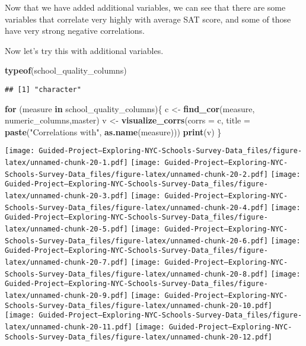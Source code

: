 \documentclass[]{article}
\newenvironment{Shaded}{\begin{snugshade}}{\end{snugshade}}
\newcommand{\ControlFlowTok}[1]{\textcolor[rgb]{0.13,0.29,0.53}{\textbf{#1}}}
\newcommand{\DataTypeTok}[1]{\textcolor[rgb]{0.13,0.29,0.53}{#1}}
\newcommand{\KeywordTok}[1]{\textcolor[rgb]{0.13,0.29,0.53}{\textbf{#1}}}
\newcommand{\NormalTok}[1]{#1}
\newcommand{\StringTok}[1]{\textcolor[rgb]{0.31,0.60,0.02}{#1}}
\begin{document}
Now that we have added additional variables, we can see that there are
some variables that correlate very highly with average SAT score, and
some of those have very strong negative correlations.

Now let's try this with additional variables.

\begin{Shaded}
\begin{Highlighting}[]
\KeywordTok{typeof}\NormalTok{(school_quality_columns)}
\end{Highlighting}
\end{Shaded}

\begin{verbatim}
## [1] "character"
\end{verbatim}

\begin{Shaded}
\begin{Highlighting}[]
\ControlFlowTok{for}\NormalTok{ (measure }\ControlFlowTok{in}\NormalTok{ school_quality_columns)\{}
\NormalTok{  c <-}\StringTok{ }\KeywordTok{find_cor}\NormalTok{(measure, numeric_columns,master)}
\NormalTok{  v <-}\StringTok{ }\KeywordTok{visualize_corrs}\NormalTok{(}\DataTypeTok{corrs =}\NormalTok{ c, }\DataTypeTok{title =} \KeywordTok{paste}\NormalTok{(}\StringTok{"Correlations with"}\NormalTok{, }\KeywordTok{as.name}\NormalTok{(measure)))}
  \KeywordTok{print}\NormalTok{(v)}
\NormalTok{\}}
\end{Highlighting}
\end{Shaded}

\texttt{[image: Guided-Project--Exploring-NYC-Schools-Survey-Data\_files/figure-latex/unnamed-chunk-20-1.pdf]}
\texttt{[image: Guided-Project--Exploring-NYC-Schools-Survey-Data\_files/figure-latex/unnamed-chunk-20-2.pdf]}
\texttt{[image: Guided-Project--Exploring-NYC-Schools-Survey-Data\_files/figure-latex/unnamed-chunk-20-3.pdf]}
\texttt{[image: Guided-Project--Exploring-NYC-Schools-Survey-Data\_files/figure-latex/unnamed-chunk-20-4.pdf]}
\texttt{[image: Guided-Project--Exploring-NYC-Schools-Survey-Data\_files/figure-latex/unnamed-chunk-20-5.pdf]}
\texttt{[image: Guided-Project--Exploring-NYC-Schools-Survey-Data\_files/figure-latex/unnamed-chunk-20-6.pdf]}
\texttt{[image: Guided-Project--Exploring-NYC-Schools-Survey-Data\_files/figure-latex/unnamed-chunk-20-7.pdf]}
\texttt{[image: Guided-Project--Exploring-NYC-Schools-Survey-Data\_files/figure-latex/unnamed-chunk-20-8.pdf]}
\texttt{[image: Guided-Project--Exploring-NYC-Schools-Survey-Data\_files/figure-latex/unnamed-chunk-20-9.pdf]}
\texttt{[image: Guided-Project--Exploring-NYC-Schools-Survey-Data\_files/figure-latex/unnamed-chunk-20-10.pdf]}
\texttt{[image: Guided-Project--Exploring-NYC-Schools-Survey-Data\_files/figure-latex/unnamed-chunk-20-11.pdf]}
\texttt{[image: Guided-Project--Exploring-NYC-Schools-Survey-Data\_files/figure-latex/unnamed-chunk-20-12.pdf]}
\end{document}
